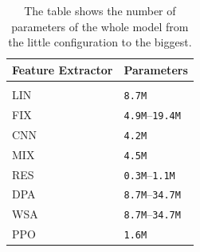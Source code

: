 \begin{table}[ht]
    \begin{center}
        \begin{tabular}{ll}
            \multicolumn{1}{l}{\textbf{Feature Extractor}}  &\multicolumn{1}{l}{\textbf{Parameters}}
            \\ \hline \\
            LIN              &  \texttt{8.7M} \\
            FIX        & \texttt{4.9M}--\texttt{19.4M} \\
            CNN       & \texttt{4.2M}\\ %
            MIX       & \texttt{4.5M} \\
            RES           & \texttt{0.3M}--\texttt{1.1M} \\
            DPA             & \texttt{8.7M}--\texttt{34.7M} \\
            WSA         & \texttt{8.7M}--\texttt{34.7M} \\
            PPO             & \texttt{1.6M} \\

        \end{tabular}
    \end{center}
    \caption{The table shows the number of parameters of the whole model from the little configuration to the biggest.}
    \label{tab:parameters}
\end{table}


